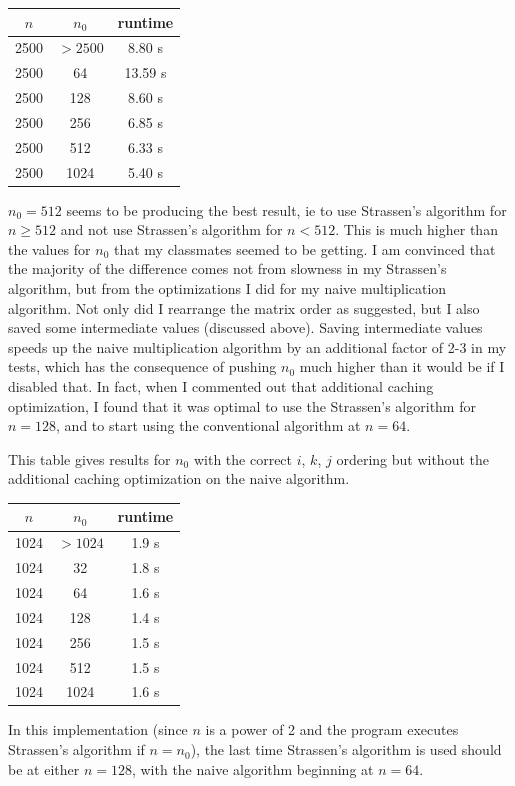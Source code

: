 \documentclass{article}
\begin{document}
\begin{center}
\begin{tabular} { |c|c|c| }
\hline
$n$ & $n_0$ & runtime \\
\hline\hline
2500 & $>2500$ & 8.80 s \\
\hline\hline
2500 & 64 &  13.59 s \\
\hline
2500 & 128 & 8.60 s \\
\hline
2500 & 256 &  6.85 s\\
\hline
2500 & 512 & 6.33 s \\ 
\hline
2500 & 1024 & 5.40 s\\
\hline
\end{tabular}
\end{center}

$n_0 = 512$ seems to be producing the best result, ie to use Strassen's algorithm for $n \geq 512$ and not use Strassen's algorithm for $n < 512$. This is much higher than the values for $n_0$ that my classmates seemed to be getting. I am convinced that the majority of the difference comes not from slowness in my Strassen's algorithm, but from the optimizations I did for my naive multiplication algorithm. Not only did I rearrange the matrix order as suggested, but I also saved some intermediate values (discussed above). Saving intermediate values speeds up the naive multiplication algorithm by an additional factor of 2-3 in my tests, which has the consequence of pushing $n_0$ much higher than it would be if I disabled that. In fact, when I commented out that additional caching optimization, I found that it was optimal to use the Strassen's algorithm for $n=128$, and to start using the conventional algorithm at $n=64$. 

This table gives results for $n_0$ with the correct $i$, $k$, $j$ ordering but without the additional caching optimization on the naive algorithm.
\begin{center}
\begin{tabular} { |c|c|c| }
\hline
$n$ & $n_0$ & runtime \\
\hline\hline
1024 & $>1024$ &  1.9 s\\
\hline\hline
1024 & 32 & 1.8 s \\
\hline
1024 & 64  & 1.6 s \\
\hline
1024 & 128 & 1.4 s\\
\hline
1024 & 256 & 1.5 s\\
\hline
1024 & 512 & 1.5 s \\ 
\hline
1024 & 1024 & 1.6 s\\
\hline
\end{tabular}
\end{center}
In this implementation (since $n$ is a power of 2 and the program executes Strassen's algorithm if $n = n_0$), the last time Strassen's algorithm is used should be at either $n=128$, with the naive algorithm beginning at $n=64$.
\end{document}
